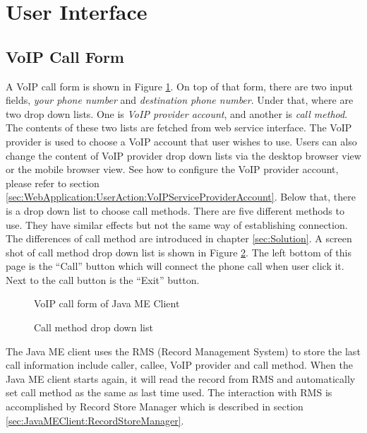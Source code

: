 \section{User Interface}
\label{sec:JavaMEClient:UserInterface}

\subsection{VoIP Call Form}
\label{sec:JavaMEClient:UserInterface:VoIPCallForm}

A VoIP call form is shown in Figure \ref{fig:VoIPCallFormOfJavaMEClient}. On top of that form, there are two input fields, \textit{your phone number} and \textit{destination phone number}. Under that, where are two drop down lists. One is \textit{VoIP provider account}, and another is \textit{call method}. The contents of these two lists are fetched from web service interface. The VoIP provider is used to choose a VoIP account that user wishes to use. Users can also change the content of VoIP provider drop down lists via the desktop browser view or the mobile browser view. See how to configure the VoIP provider account, please refer to section \ref{sec:WebApplication:UserAction:VoIPServiceProviderAccount}. Below that, there is a drop down list to choose call methods. There are five different methods to use. They have similar effects but not the same way of establishing connection. The differences of call method are introduced in chapter \ref{sec:Solution}. A screen shot of call method drop down list is shown in Figure \ref{fig:CallMethodDropDownList}. The left bottom of this page is the ``Call'' button which will connect the phone call when user click it. Next to the call button is the ``Exit'' button.

\begin{figure}[!hbtp]
\centering
{}
\caption{VoIP call form of Java ME Client}
\label{fig:VoIPCallFormOfJavaMEClient}
\end{figure}

\begin{figure}[!hbtp]
\centering
{}
\caption{Call method drop down list}
\label{fig:CallMethodDropDownList}
\end{figure}

The Java ME client uses the RMS (Record Management System) to store the last call information include caller, callee, VoIP provider and call method. When the Java ME client starts again, it will read the record from RMS and automatically set call method as the same as last time used. The interaction with RMS is accomplished by \textsf{Record Store Manager} which is described in section \ref{sec:JavaMEClient:RecordStoreManager}.

